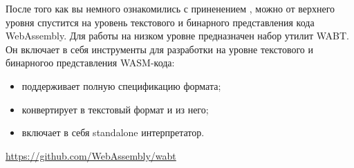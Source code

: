 \label{wabt}

После того как вы немного ознакомились с приненением \wasm, можно от верхнего
уровня спустится на уровень текстового и бинарного представления кода
WebAssembly. Для работы на низком уровне предназначен набор утилит WABT. Он
включает в себя инструменты для разработки на уровне текстового и бинарногоо
представления WASM-кода:
\begin{itemize}[nosep]
  \item поддерживает полную спецификацию формата;
  \item конвертирует в текстовый формат и из него;
  \item включает в себя standalone интерпретатор.
\end{itemize}

\bigskip
\url{https://github.com/WebAssembly/wabt}

